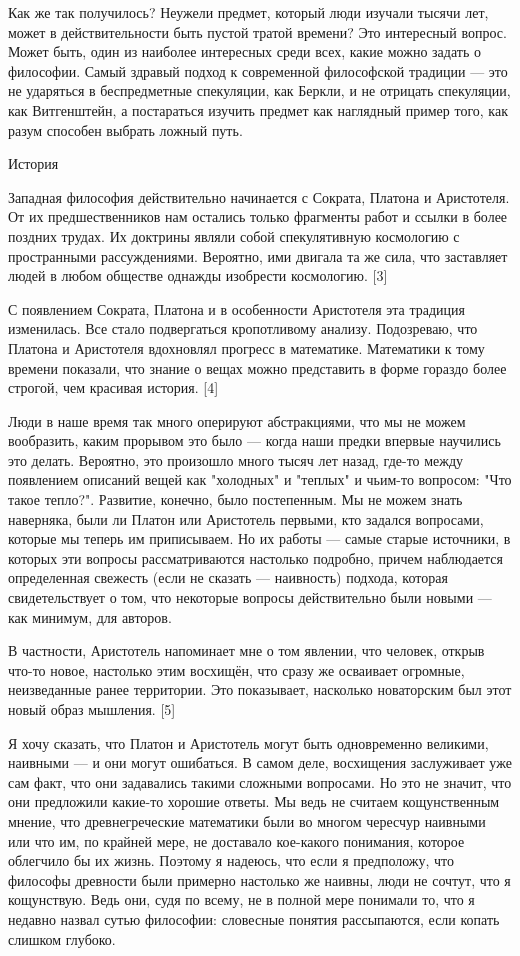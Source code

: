 \documentclass[ebook,12pt,oneside,openany]{memoir}
\begin{document}
Как же так получилось? Неужели предмет, который люди изучали тысячи
лет, может в действительности быть пустой тратой времени? Это
интересный вопрос. Может быть, один из наиболее интересных среди всех,
какие можно задать о философии. Самый здравый подход к современной
философской традиции — это не ударяться в беспредметные спекуляции,
как Беркли, и не отрицать спекуляции, как Витгенштейн, а постараться
изучить предмет как наглядный пример того, как разум способен выбрать
ложный путь.

История

Западная философия действительно начинается с Сократа, Платона и
Аристотеля. От их предшественников нам остались только фрагменты работ
и ссылки в более поздних трудах. Их доктрины являли собой
спекулятивную космологию с пространными рассуждениями. Вероятно, ими
двигала та же сила, что заставляет людей в любом обществе однажды
изобрести космологию. [3]

С появлением Сократа, Платона и в особенности Аристотеля эта традиция
изменилась. Все стало подвергаться кропотливому анализу. Подозреваю,
что Платона и Аристотеля вдохновлял прогресс в математике. Математики
к тому времени показали, что знание о вещах можно представить в форме
гораздо более строгой, чем красивая история. [4]

Люди в наше время так много оперируют абстракциями, что мы не можем
вообразить, каким прорывом это было — когда наши предки впервые
научились это делать. Вероятно, это произошло много тысяч лет назад,
где-то между появлением описаний вещей как "холодных" и "теплых" и
чьим-то вопросом: "Что такое тепло?". Развитие, конечно, было
постепенным. Мы не можем знать наверняка, были ли Платон или
Аристотель первыми, кто задался вопросами, которые мы теперь им
приписываем. Но их работы — самые старые источники, в которых эти
вопросы рассматриваются настолько подробно, причем наблюдается
определенная свежесть (если не сказать — наивность) подхода, которая
свидетельствует о том, что некоторые вопросы действительно были новыми
— как минимум, для авторов.

В частности, Аристотель напоминает мне о том явлении, что человек,
открыв что-то новое, настолько этим восхищён, что сразу же осваивает
огромные, неизведанные ранее территории. Это показывает, насколько
новаторским был этот новый образ мышления. [5]

Я хочу сказать, что Платон и Аристотель могут быть одновременно
великими, наивными — и они могут ошибаться. В самом деле, восхищения
заслуживает уже сам факт, что они задавались такими сложными
вопросами. Но это не значит, что они предложили какие-то хорошие
ответы. Мы ведь не считаем кощунственным мнение, что древнегреческие
математики были во многом чересчур наивными или что им, по крайней
мере, не доставало кое-какого понимания, которое облегчило бы их
жизнь. Поэтому я надеюсь, что если я предположу, что философы
древности были примерно настолько же наивны, люди не сочтут, что я
кощунствую. Ведь они, судя по всему, не в полной мере понимали то, что
я недавно назвал сутью философии: словесные понятия рассыпаются, если
копать слишком глубоко.
\end{document}
